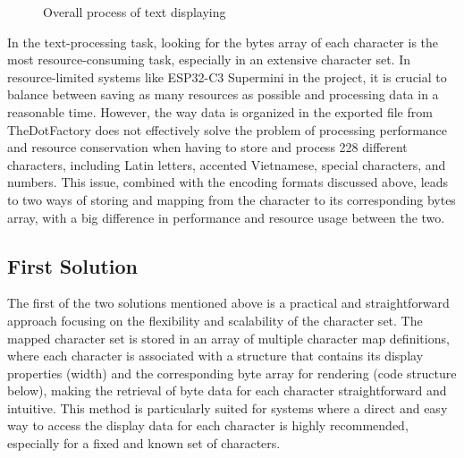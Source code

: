 \documentclass[../Main.tex]{subfiles}
\begin{document}
\begin{figure}[H]
    \centering
    {\fontsize{10pt}{8pt}\selectfont 
    }
    \caption{Overall process of text displaying}
    \label{fig:font-display}
\end{figure}

In the text-processing task, looking for the bytes array of each character is the most resource-consuming task, especially in an extensive character set. In resource-limited systems like ESP32-C3 Supermini in the project, it is crucial to balance between saving as many resources as possible and processing data in a reasonable time. However, the way data is organized in the exported file from TheDotFactory does not effectively solve the problem of processing performance and resource conservation when having to store and process 228 different characters, including Latin letters, accented Vietnamese, special characters, and numbers. This issue, combined with the encoding formats discussed above, leads to two ways of storing and mapping from the character to its corresponding bytes array, with a big difference in performance and resource usage between the two.

\subsection{First Solution}
The first of the two solutions mentioned above is a practical and straightforward approach focusing on the flexibility and scalability of the character set. The mapped character set is stored in an array of multiple character map definitions, where each character is associated with a structure that contains its display properties (width) and the corresponding byte array for rendering (code structure below), making the retrieval of byte data for each character straightforward and intuitive. This method is particularly suited for systems where a direct and easy way to access the display data for each character is highly recommended, especially for a fixed and known set of characters.
\end{document}
